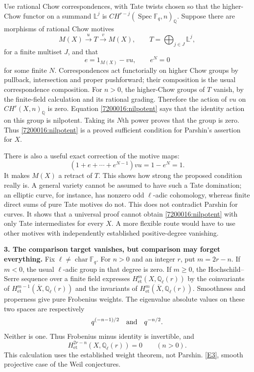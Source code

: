 \documentclass[11pt,a4paper]{article}
\newcommand{\Q}{\mathbb{Q}}
\newcommand{\F}{\mathbb{F}}
\newcommand{\eref}[2]{\hyperlink{extra:#1:#2}{[E#2]}}
\numberwithin{equation}{section}
\begin{document}
Use rational Chow correspondences, with Tate twists chosen so that the
higher-Chow functor on a summand $\mathbb L^j$ is
$CH^{r-j}(\operatorname{Spec}\F_q,n)_{\Q}$.
Suppose there are morphisms of rational Chow motives
\[
 M(X)\xrightarrow{u}T\xrightarrow{v}M(X),\qquad
 T=\bigoplus_{j\in J}\mathbb L^j,
\]
for a finite multiset $J$, and that
\begin{equation}\label{7200016:nilpotent}
 e=1_{M(X)}-v u,\qquad e^N=0
\end{equation}
for some finite $N$. Correspondences act functorially on higher Chow
groups by pullback, intersection and proper pushforward; their
composition is the usual correspondence composition. For $n>0$, the
higher-Chow groups of $T$ vanish, by the finite-field calculation and
its rational grading. Therefore the action of $vu$ on
$CH^r(X,n)_{\Q}$ is zero. Equation \eqref{7200016:nilpotent} says that the
identity action on this group is nilpotent. Taking its $N$th power
proves that the group is zero. Thus \eqref{7200016:nilpotent} is a proved
sufficient condition for Parshin's assertion for $X$.

There is also a useful exact correction of the motive maps:
\[
 (1+e+\cdots+e^{N-1})vu=1-e^N=1.
\]
It makes $M(X)$ a retract of $T$. This shows how strong the proposed
condition really is. A general variety cannot be assumed to have such
a Tate domination; an elliptic curve, for instance, has nonzero odd
$\ell$-adic cohomology, whereas finite direct sums of pure Tate motives
do not. This does not contradict Parshin for curves. It shows that a
universal proof cannot obtain \eqref{7200016:nilpotent} with only Tate
intermediates for every $X$. A more flexible route would have to use
other motives with independently established positive-degree vanishing.

\textbf{3. The comparison target vanishes, but comparison may forget everything.}
Fix $\ell\ne\operatorname{char}\F_q$. For $n>0$ and an integer $r$,
put $m=2r-n$. If $m<0$, the usual $\ell$-adic group in that degree is
zero. If $m\ge0$, the Hochschild--Serre sequence over a finite field
expresses $H^m_{\mathrm{et}}(X,\Q_\ell(r))$ by the coinvariants of
$H^{m-1}_{\mathrm{et}}(\overline X,\Q_\ell(r))$ and the invariants of
$H^m_{\mathrm{et}}(\overline X,\Q_\ell(r))$.
Smoothness and properness give pure Frobenius weights. The eigenvalue
absolute values on these two spaces are respectively
\[
 q^{(-n-1)/2}\quad\hbox{and}\quad q^{-n/2}.
\]
Neither is one. Thus Frobenius minus identity is invertible, and
\begin{equation}\label{7200016:etale}
 H^{2r-n}_{\mathrm{et}}(X,\Q_\ell(r))=0\qquad(n>0).
\end{equation}
This calculation uses the established weight theorem, not Parshin.
\eref{7200016}{3}, smooth projective case of the Weil conjectures.
\end{document}
